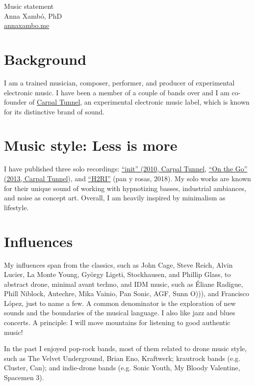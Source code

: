 \documentclass[10pt, a4paper]{article}
\begin{document}
{\LARGE Music statement}\\[0.2cm]
Anna Xambó, PhD\\
\href{http://annaxambo.me}{annaxambo.me}

\section*{Background}

I am a trained musician, composer, performer, and producer of experimental electronic music. I have been a member of a couple of bands over and I am co-founder of \href{http://carpaltunnel.cat}{Carpal Tunnel}, an experimental electronic music label, which is known for its distinctive brand of sound. 

\section*{Music style: Less is more}

I have published three solo recordings: \href{http://carpaltunnel.cat/CT002.php}{``init'' (2010, Carpal Tunnel}, \href{http://carpaltunnel.cat/CT004.php}{ ``On the Go'' (2013, Carpal Tunnel}), and \href{http://www.panyrosasdiscos.net/pyr247-anna-xambo-h2ri/}{``H2RI''} (pan y rosas, 2018). My solo works are known for their unique sound of working with hypnotizing basses, industrial ambiances, and noise as concept art. Overall, I am heavily inspired by minimalism as lifestyle.

\section*{Influences}

My influences span from the classics, such as John Cage, Steve Reich, Alvin Lucier, La Monte Young, György Ligeti, Stockhausen, and Phillip Glass, to abstract drone, minimal avant techno, and IDM music, such as Éliane Radigue, Phill Niblock, Autechre, Mika Vainio, Pan Sonic, AGF, Sunn O))), and Francisco López, just to name a few. A common denominator is the exploration of new sounds and the boundaries of the musical language. I also like jazz and blues concerts. A principle: I will move mountains for listening to good authentic music! 

In the past I enjoyed pop-rock bands, most of them related to drone music style, such as The Velvet Underground, Brian Eno, Kraftwerk; krautrock bands (e.g. Cluster, Can); and indie-drone bands (e.g. Sonic Youth, My Bloody Valentine, Spacemen 3).
\end{document}

